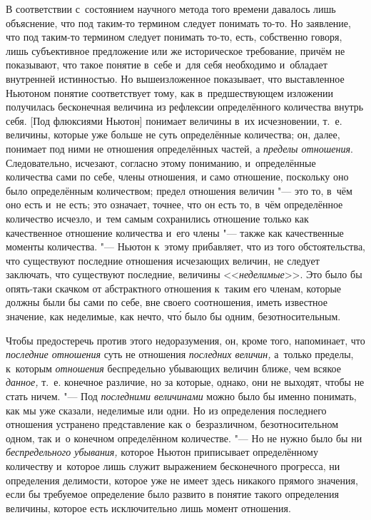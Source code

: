 В соответствии с~состоянием научного метода того времени давалось лишь
объяснение, что под таким-то термином следует понимать то-то. Но заявление,
что под таким-то термином следует понимать то-то, есть, собственно говоря,
лишь субъективное предложение или же историческое требование, причём не
показывают, что такое понятие в~себе и~для себя необходимо и~обладает внутренней
истинностью. Но вышеизложенное показывает, что выставленное Ньютоном понятие
соответствует тому, как в~предшествующем изложении получилась бесконечная
величина из рефлексии определённого количества внутрь себя. [Под флюксиями
Ньютон] понимает величины в~их исчезновении, т.~е. величины, которые уже больше
не суть определённые количества; он, далее, понимает под ними не отношения
определённых частей, а {\em пределы отношения}. Следовательно, исчезают, согласно
этому пониманию, и~определённые количества сами по себе, члены отношения, и
само отношение, поскольку оно было определённым количеством; предел
отношения величин "--- это то, в~чём оно есть и~не есть; это означает, точнее, что
он есть то, в~чём определённое количество исчезло, и~тем самым сохранились
отношение только как качественное отношение количества и~его члены "--- также
как качественные моменты количества. "--- Ньютон к~этому прибавляет, что из
того обстоятельства, что существуют последние отношения исчезающих величин, не
следует заключать, что существуют последние, величины <<{\em неделимые}>>. Это
было бы опять-таки скачком от абстрактного отношения к~таким его членам,
которые должны были бы сами по себе, вне своего соотношения, иметь известное
значение, как неделимые, как нечто, чт\'{о} было бы одним, безотносительным.

Чтобы предостеречь против этого недоразумения, он, кроме того, напоминает, что
{\em последние отношения} суть не отношения {\em последних величин,} а~только
пределы, к~которым {\em отношения} беспредельно убывающих величин
ближе, чем всякое {\em данное,} т.~е. конечное различие, но за которые, однако, они не
выходят, чтобы не стать ничем. "--- Под {\em последними величинами} можно было
бы именно понимать, как мы уже сказали, неделимые или одни. Но из определения
последнего отношения устранено представление как о~безразличном,
безотносительном одном, так и~о конечном определённом количестве. "--- Но
не нужно было бы ни {\em беспредельного убывания,} которое Ньютон приписывает
определённому количеству и~которое лишь служит выражением бесконечного
прогресса, ни определения делимости, которое уже не имеет здесь никакого
прямого значения, если бы требуемое определение было развито
в понятие такого определения величины, которое есть исключительно
лишь момент отношения.

